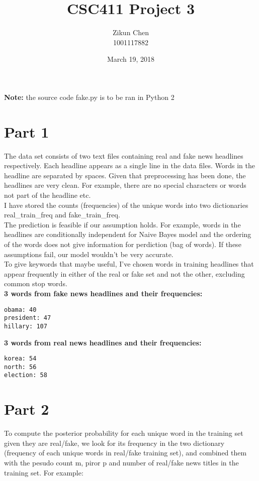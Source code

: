 \documentclass{article}
\begin{document}
\title{CSC411 Project 3}
\author{Zikun Chen\\1001117882}
\date{March 19, 2018}
\maketitle 

\textbf{Note:} the source code fake.py is to be ran in Python 2


\section*{Part 1}
\noindent
The data set consists of two text files containing real and fake news headlines respectively. Each headline appears as a single line in the data files. Words in the headline are separated by spaces. Given that preprocessing has been done, the headlines are very clean. For example, there are no special characters or words not part of the headline etc.\\

\noindent
I have stored the counts (frequencies) of the unique words into two dictionaries real\_train\_freq and fake\_train\_freq.\\

\noindent
The prediction is feasible if our assumption holds. For example, words in the headlines are conditionally independent for Naive Bayes model and the ordering of the words does not give information for perdiction (bag of words). If these assumptions fail, our model wouldn't be very accurate.\\

\noindent
To give keywords that maybe useful, I've chosen words in training headlines that appear frequently in either of the real or fake set and not the other, excluding common stop words.\\

\noindent
\textbf{3 words from fake news headlines and their frequencies:
}
\begin{verbatim}
obama: 40
president: 47
hillary: 107
\end{verbatim}

\noindent
\textbf{3 words from real news headlines and their frequencies:
}
\begin{verbatim}
korea: 54
north: 56
election: 58 
\end{verbatim}



\section*{Part 2}
To compute the posterior probability for each unique word in the training set given they are real/fake, we look for its frequency in the two dictionary (frequency of each unique words in real/fake training set), and combined them with the pesudo count m, piror p and number of real/fake news titles in the training set. For example:
\end{document}
